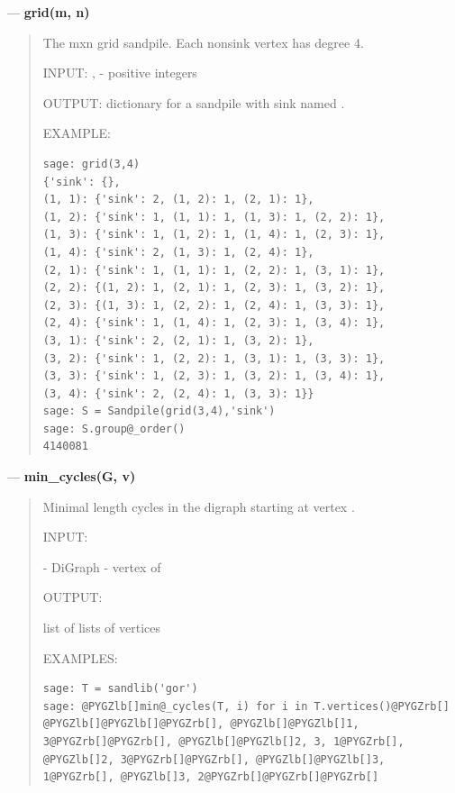 \documentclass[letterpaper,10pt,english]{manual}
\begin{document}
---
\hypertarget{grid-m-n}{}
\textbf{grid(m, n)}
\begin{quote}

The mxn grid sandpile.  Each nonsink vertex has degree 4.

INPUT:
,  - positive integers

OUTPUT:
dictionary for a sandpile with sink named .

EXAMPLE:

\begin{Verbatim}[commandchars=@\[\]]
sage: grid(3,4)
{'sink': {},
(1, 1): {'sink': 2, (1, 2): 1, (2, 1): 1},
(1, 2): {'sink': 1, (1, 1): 1, (1, 3): 1, (2, 2): 1},
(1, 3): {'sink': 1, (1, 2): 1, (1, 4): 1, (2, 3): 1},
(1, 4): {'sink': 2, (1, 3): 1, (2, 4): 1},
(2, 1): {'sink': 1, (1, 1): 1, (2, 2): 1, (3, 1): 1},
(2, 2): {(1, 2): 1, (2, 1): 1, (2, 3): 1, (3, 2): 1},
(2, 3): {(1, 3): 1, (2, 2): 1, (2, 4): 1, (3, 3): 1},
(2, 4): {'sink': 1, (1, 4): 1, (2, 3): 1, (3, 4): 1},
(3, 1): {'sink': 2, (2, 1): 1, (3, 2): 1},
(3, 2): {'sink': 1, (2, 2): 1, (3, 1): 1, (3, 3): 1},
(3, 3): {'sink': 1, (2, 3): 1, (3, 2): 1, (3, 4): 1},
(3, 4): {'sink': 2, (2, 4): 1, (3, 3): 1}}
sage: S = Sandpile(grid(3,4),'sink')
sage: S.group@_order()
4140081
\end{Verbatim}
\end{quote}

---
\hypertarget{min-cycles-g-v}{}
\textbf{min\_cycles(G, v)}
\begin{quote}

Minimal length cycles in the digraph  starting at vertex .

INPUT:

 - DiGraph
 - vertex of 

OUTPUT:

list of lists of vertices

EXAMPLES:

\begin{Verbatim}[commandchars=@\[\]]
sage: T = sandlib('gor')
sage: @PYGZlb[]min@_cycles(T, i) for i in T.vertices()@PYGZrb[]
@PYGZlb[]@PYGZlb[]@PYGZrb[], @PYGZlb[]@PYGZlb[]1, 3@PYGZrb[]@PYGZrb[], @PYGZlb[]@PYGZlb[]2, 3, 1@PYGZrb[], @PYGZlb[]2, 3@PYGZrb[]@PYGZrb[], @PYGZlb[]@PYGZlb[]3, 1@PYGZrb[], @PYGZlb[]3, 2@PYGZrb[]@PYGZrb[]@PYGZrb[]
\end{Verbatim}
\end{quote}
\end{document}
